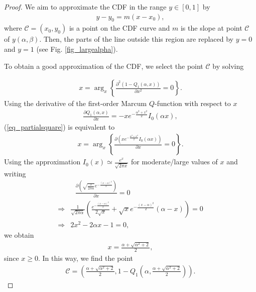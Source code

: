 \begin{proof}

We aim to approximate the CDF in the range $y \in [0, 1]$ by 
\begin{align}\label{eq_YY}
    y-y_0 = m(x-x_0),
\end{align}
where $\mathcal{C} = (x_0,y_0)$ is a point on the CDF curve and $m$ is the slope at point $\mathcal{C}$ of $y(\alpha,\beta)$. Then, the parts of the line outside this region are replaced by $y=0$ and $y=1$ (see Fig. \ref{fig_largealpha}).

To obtain a good approximation of the CDF, we select the point $\mathcal{C}$ by solving

\begin{align}\label{eq_partialsquare}
  x = \mathop{\arg}_{x} \left\{  \frac{\partial^2\left(1-Q_1(\alpha,x)\right)}{\partial x^2} = 0\right\}.
\end{align}
Using the derivative of the first-order Marcum $Q$-function with respect to $x$ \cite[Eq. (2)]{Pratt1968PIpartial}
\begin{align}\label{eq_derivativeMarcumQ}
    \frac{\partial Q_1(\alpha,x)}{\partial x} = -x e^{-\frac{\alpha^2+x^2}{2}}I_0(\alpha x),
\end{align}
(\ref{eq_partialsquare}) is equivalent to 
\begin{align}
  x =  \mathop{\arg}_{x} \left\{\frac{\partial\left(x e^{-\frac{\alpha^2+x^2}{2}}I_0(\alpha x)\right)}{\partial x}=0\right\}.
\end{align}
Using the approximation $I_0(x) \simeq \frac{e^x}{\sqrt{2\pi x}} $ \cite[Eq. (9.7.1)]{abramowitz1999ia} for moderate/large values of $x$ and writing
\begin{align}
    &~~~\frac{\partial\left(\sqrt{\frac{x}{2\pi \alpha}}e^{-\frac{(x-\alpha)^2}{2}}\right)}{\partial x} = 0\nonumber\\
  \Rightarrow &\frac{1}{\sqrt{2\pi\alpha}}\left(\frac{e^{-\frac{(x-\alpha)^2}{2}}}{2\sqrt{x}}+\sqrt{x}e^{-\frac{(x-\alpha)^2}{2}}(\alpha-x)\right)  = 0\nonumber\\
    \Rightarrow &2x^2-2\alpha x-1 =0,
\end{align}
we obtain 
\begin{align}\label{eq_beta0}
    x = \frac{\alpha+\sqrt{\alpha^2+2}}{2},
\end{align}
since $x\geq0$. In this way, we find the point 
\begin{align}
    \mathcal{C}=\left(\frac{\alpha+\sqrt{\alpha^2+2}}{2}, 1-Q_1\left(\alpha,\frac{\alpha+\sqrt{\alpha^2+2}}{2}\right)\right).
\end{align}


\end{proof}
